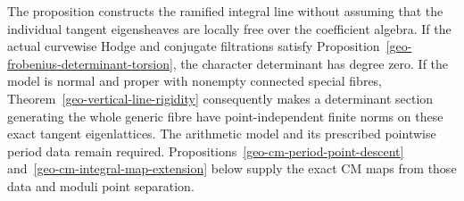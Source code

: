The proposition constructs the ramified integral line without assuming
that the individual tangent eigensheaves are locally free over the
coefficient algebra. If the actual curvewise Hodge and conjugate
filtrations satisfy Proposition~\ref{geo-frobenius-determinant-torsion},
the character determinant has degree zero. If the model is normal and
proper with nonempty connected special fibres,
Theorem~\ref{geo-vertical-line-rigidity} consequently makes a determinant
section generating the whole generic fibre have point-independent finite norms on
these exact tangent eigenlattices.
The arithmetic model and its prescribed pointwise period data remain
required. Propositions~\ref{geo-cm-period-point-descent}
and~\ref{geo-cm-integral-map-extension} below supply the exact CM maps
from those data and moduli point separation.
